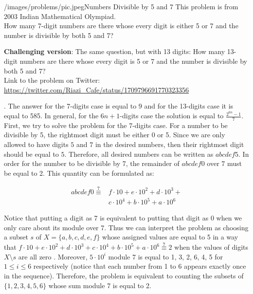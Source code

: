 \begin{problem}{/images/problems/pic.jpeg}{Numbers Divisible by 5 and 7}
	This problem is from 2003 Indian Mathematical Olympiad.\\[0.2cm]
	
	How many 7-digit numbers are there whose every digit is either 5 or 7 and the number is divisible by both 5 and 7?
	
	\textbf{Challenging version}: The same question, but with 13 digits: How many 13-digit numbers are there whose every digit is 5 or 7 and the number is divisible by both 5 and 7?\\[0.2cm]
	
Link to the problem on Twitter:  \url{https://twitter.com/Riazi_Cafe/status/1709796691770323356}\end{problem}
\begin{solution}.
The answer for the 7-digits case is equal to 9 and for the 13-digits case it is equal to 585. In general, for the $6n+1$-digits case the solution is equal to $\frac{2^{6n}-1}{7}$.\\[0.2cm]

First, we try to solve the problem for the 7-digits case. For a number to be divisible by 5, the rightmost digit must be either 0 or 5. Since we are only allowed to have digits $5$ and $7$ in the desired numbers, then their rightmost digit should be equal to $5$. Therefore, all desired numbers can be written as $abcdef5$. In order for the  number to be divisible by 7, the remainder of $abcdef0$ over 7 must be equal to 2. This quantity can be formulated as:

$$
\begin{aligned}
abcdef0 \overset{7}{\equiv}  &f \cdot 10  + e \cdot 10^2  + d \cdot 10^3 + \\
&c \cdot 10^4  + b \cdot 10^5  + a \cdot 10^6 
\end{aligned}
$$

Notice that putting a digit as 7 is equivalent to putting that digit as 0 when we only care about its module over 7. Thus we can interpret the problem as choosing a subset $s$ of  $X = \{ a, b, c, d, e, f\}$ whose assigned values are equal to 5 in a way that $f \cdot 10  + e \cdot 10^2  + d \cdot 10^3 + 
c \cdot 10^4  + b \cdot 10^5  + a \cdot 10^6 \overset{7}{\equiv} 2$ when the values of digits $X \setminus s$ are all zero . Moreover, $5 \cdot 10^i$ module 7 is equal to 1, 3, 2, 6, 4, 5 for $1 \leq i \leq 6$ respectively (notice that each number from 1 to 6 appears exactly once in the sequence). Therefore, the  problem is equivalent to counting the subsets of $\{1, 2, 3, 4, 5, 6\}$ whose sum module 7 is equal to 2.


\end{solution}
